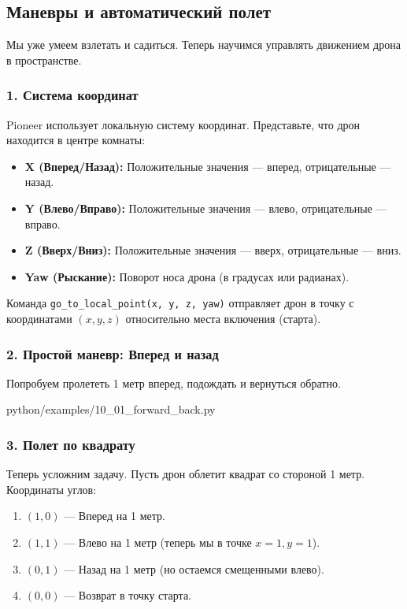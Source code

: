 \subsection{Маневры и автоматический полет}

Мы уже умеем взлетать и садиться. Теперь научимся управлять движением дрона в пространстве.

\subsubsection*{1. Система координат}
Pioneer использует локальную систему координат. Представьте, что дрон находится в центре комнаты:
\begin{itemize}
    \item \textbf{X (Вперед/Назад):} Положительные значения — вперед, отрицательные — назад.
    \item \textbf{Y (Влево/Вправо):} Положительные значения — влево, отрицательные — вправо.
    \item \textbf{Z (Вверх/Вниз):} Положительные значения — вверх, отрицательные — вниз.
    \item \textbf{Yaw (Рыскание):} Поворот носа дрона (в градусах или радианах).
\end{itemize}

Команда \texttt{go\_to\_local\_point(x, y, z, yaw)} отправляет дрон в точку с координатами $(x, y, z)$ относительно места включения (старта).

\subsubsection*{2. Простой маневр: Вперед и назад}
Попробуем пролететь 1 метр вперед, подождать и вернуться обратно.

\begin{codefile}[python]{python/examples/10_01_forward_back.py}
\end{codefile}

\subsubsection*{3. Полет по квадрату}
Теперь усложним задачу. Пусть дрон облетит квадрат со стороной 1 метр.
Координаты углов:
\begin{enumerate}
    \item $(1, 0)$ — Вперед на 1 метр.
    \item $(1, 1)$ — Влево на 1 метр (теперь мы в точке $x=1, y=1$).
    \item $(0, 1)$ — Назад на 1 метр (но остаемся смещенными влево).
    \item $(0, 0)$ — Возврат в точку старта.
\end{enumerate}

